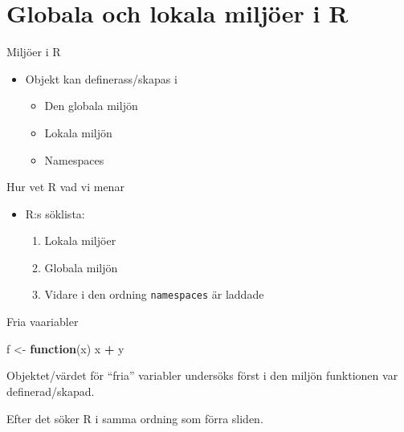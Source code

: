 \documentclass[
  11pt,
  ignorenonframetext,
]{beamer}
\newenvironment{Shaded}{\begin{snugshade}}{\end{snugshade}}
\newcommand{\ControlFlowTok}[1]{\textcolor[rgb]{0.13,0.29,0.53}{\textbf{#1}}}
\newcommand{\NormalTok}[1]{#1}
\newcommand{\OtherTok}[1]{\textcolor[rgb]{0.56,0.35,0.01}{#1}}
\newcommand{\SpecialCharTok}[1]{\textcolor[rgb]{0.81,0.36,0.00}{\textbf{#1}}}
\providecommand{\tightlist}{%
  \setlength{\itemsep}{0pt}\setlength{\parskip}{0pt}}
\begin{document}
\section{Globala och lokala miljöer i
R}\label{globala-och-lokala-miljuxf6er-i-r}

\begin{frame}{Miljöer i R}
\label{miljuxf6er-i-r}
\begin{itemize}
\tightlist
\item
  Objekt kan definerass/skapas i

  \begin{itemize}
  \tightlist
  \item
    Den globala miljön
  \item
    Lokala miljön
  \item
    Namespaces
  \end{itemize}
\end{itemize}
\end{frame}

\begin{frame}{Hur vet R vad vi menar}
\label{hur-vet-r-vad-vi-menar}
\begin{itemize}
\tightlist
\item
  R:s söklista:

  \begin{enumerate}
  \tightlist
  \item
    Lokala miljöer
  \item
    Globala miljön
  \item
    Vidare i den ordning \texttt{namespaces} är laddade
  \end{enumerate}
\end{itemize}
\end{frame}

\begin{frame}[fragile]{Fria vaariabler}
\label{fria-vaariabler}
\begin{Shaded}
\begin{Highlighting}[]
\NormalTok{f }\OtherTok{\textless{}{-}} \ControlFlowTok{function}\NormalTok{(x) x }\SpecialCharTok{+}\NormalTok{ y}
\end{Highlighting}
\end{Shaded}

Objektet/värdet för ``fria'' variabler undersöks först i den miljön
funktionen var definerad/skapad.

Efter det söker R i samma ordning som förra sliden.
\end{frame}
\end{document}
